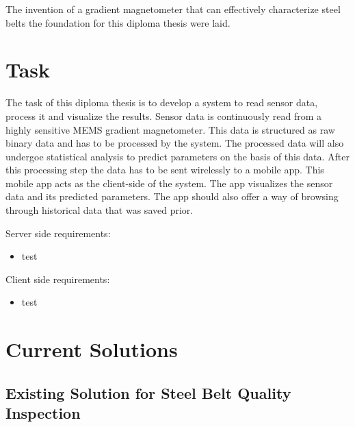 The invention of a gradient magnetometer that can effectively characterize steel belts the foundation for this diploma thesis were laid.


\section{Task}

The task of this diploma thesis is to develop a system to read sensor data, process it and visualize the results. Sensor data is continuously read from a highly sensitive MEMS gradient magnetometer. This data is structured as raw binary data and has to be processed by the system. The processed data will also undergoe statistical analysis to predict parameters on the basis of this data. After this processing step the data has to be sent wirelessly to a mobile app. This mobile app acts as the client-side of the system. The app visualizes the sensor data and its predicted parameters. The app should also offer a way of browsing through historical data that was saved prior.


Server side requirements:

\begin{itemize}
    \item test
\end{itemize}


Client side requirements:

\begin{itemize}
    \item test
\end{itemize}

\section{Current Solutions}



\subsection{Existing Solution for Steel Belt Quality Inspection}

